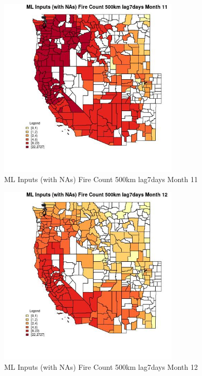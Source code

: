 \begin{figure} 
\centering  
\includegraphics[width=0.77\textwidth]{Code_Outputs/Report_ML_input_PM25_Step4_part_f_de_duplicated_aves_prioritize_24hr_obswNAs_CountyFire_Count_500km_lag7daysmedianMonth11.jpg} 
\caption{\label{fig:Report_ML_input_PM25_Step4_part_f_de_duplicated_aves_prioritize_24hr_obswNAsCountyFire_Count_500km_lag7daysmedianMonth11}ML Inputs (with NAs) Fire Count 500km lag7days Month 11} 
\end{figure} 
 

\begin{figure} 
\centering  
\includegraphics[width=0.77\textwidth]{Code_Outputs/Report_ML_input_PM25_Step4_part_f_de_duplicated_aves_prioritize_24hr_obswNAs_CountyFire_Count_500km_lag7daysmedianMonth12.jpg} 
\caption{\label{fig:Report_ML_input_PM25_Step4_part_f_de_duplicated_aves_prioritize_24hr_obswNAsCountyFire_Count_500km_lag7daysmedianMonth12}ML Inputs (with NAs) Fire Count 500km lag7days Month 12} 
\end{figure} 
 


